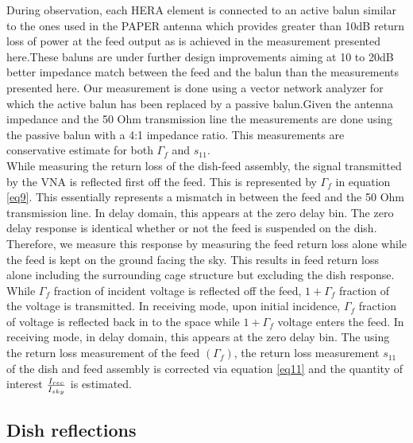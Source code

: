 \documentclass[twocolumn]{emulateapj}
\begin{document}
    During observation, each HERA element is connected to an active balun similar
    to the ones used in the PAPER antenna which provides greater than 10dB return
    loss of power at the feed output as is achieved in the measurement presented
    here.These baluns are under further design improvements aiming at 10 to 20dB
    better impedance match between the feed and the balun than the measurements
    presented here.  Our measurement is done using a vector network analyzer for
    which the active balun has been replaced by a passive balun.Given the antenna
    impedance and the 50 Ohm transmission line the measurements are done using the
    passive balun with a 4:1 impedance ratio. This measurements are conservative
    estimate  for both $\Gamma_{f}$ and $s_{11}$.\\ While measuring the return loss
    of the dish-feed assembly, the signal transmitted by the VNA is reflected first
    off the feed. This is represented by $\Gamma_{f}$ in equation \ref{eq9}. This
    essentially represents a mismatch in between the feed and the 50 Ohm
    transmission line. In delay domain, this appears at the zero delay bin. The
    zero delay response is identical whether or not the feed is suspended on the
    dish. Therefore, we measure this response by measuring the feed return loss
    alone while the feed is kept on the ground facing the sky. This results in feed
    return loss alone including the surrounding cage structure but excluding the
    dish response. While $\Gamma_{f}$ fraction of incident voltage is reflected off
    the feed, $1+\Gamma_{f}$ fraction of the voltage is transmitted. In receiving
    mode, upon initial incidence, $\Gamma_{f}$ fraction of voltage is reflected
    back in to the space while $1+\Gamma_{f}$ voltage enters the feed. In receiving
    mode, in delay domain, this appears at the zero delay bin.  The using the
    return loss measurement of the feed $(\Gamma_{f})$, the return loss measurement
    $s_{11}$ of the dish and feed assembly is corrected via equation \ref{eq11} and
    the quantity of interest ${I_{rec}\over I_{sky}}$ is estimated. 
    
    
    \subsection{Dish reflections}
    
\end{document}
